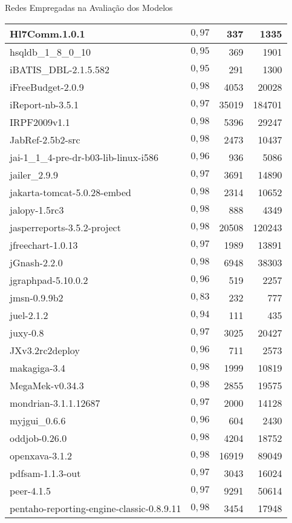 \begin{chapter}{Redes Empregadas na Avaliação dos Modelos}
\begin{center}
\begin{longtable}{| p{10cm} | c | r | r |}
	Hl7Comm.1.0.1 &  $0,97$ & 337 & 1335 \\ \hline
	hsqldb\_1\_8\_0\_10 &  $0,95$ & 369 & 1901 \\ \hline
	iBATIS\_DBL-2.1.5.582 &  $0,95$ & 291 & 1300 \\ \hline
	iFreeBudget-2.0.9 &  $0,98$ & 4053 & 20028 \\ \hline
	iReport-nb-3.5.1 &  $0,97$ & 35019 & 184701 \\ \hline
	IRPF2009v1.1 &  $0,98$ & 5396 & 29247 \\ \hline
	JabRef-2.5b2-src &  $0,98$ & 2473 & 10437 \\ \hline
	jai-1\_1\_4-pre-dr-b03-lib-linux-i586 &  $0,96$ & 936 & 5086 \\ \hline
	jailer\_2.9.9 &  $0,97$ & 3691 & 14890 \\ \hline
	jakarta-tomcat-5.0.28-embed &  $0,98$ & 2314 & 10652 \\ \hline
	jalopy-1.5rc3 &  $0,98$ & 888 & 4349 \\ \hline
	jasperreports-3.5.2-project &  $0,98$ & 20508 & 120243 \\ \hline
	jfreechart-1.0.13 &  $0,97$ & 1989 & 13891 \\ \hline
	jGnash-2.2.0 &  $0,98$ & 6948 & 38303 \\ \hline
	jgraphpad-5.10.0.2 &  $0,96$ & 519 & 2257 \\ \hline
	jmsn-0.9.9b2 &  $0,83$ & 232 & 777 \\ \hline
	juel-2.1.2 &  $0,94$ & 111 & 435 \\ \hline
	juxy-0.8 &  $0,97$ & 3025 & 20427 \\ \hline
	JXv3.2rc2deploy &  $0,96$ & 711 & 2573 \\ \hline
	makagiga-3.4 &  $0,98$ & 1999 & 10819 \\ \hline
	MegaMek-v0.34.3 &  $0,98$ & 2855 & 19575 \\ \hline
	mondrian-3.1.1.12687 &  $0,97$ & 2000 & 14128 \\ \hline
	myjgui\_0.6.6 &  $0,96$ & 604 & 2430 \\ \hline
	oddjob-0.26.0 &  $0,98$ & 4204 & 18752 \\ \hline
	openxava-3.1.2 &  $0,98$ & 16919 & 89049 \\ \hline
	pdfsam-1.1.3-out &  $0,97$ & 3043 & 16024 \\ \hline
	peer-4.1.5 &  $0,97$ & 9291 & 50614 \\ \hline
	pentaho-reporting-engine-classic-0.8.9.11 &  $0,98$ & 3454 & 17948 \\ \hline

\end{longtable}
\end{center}
\end{chapter}
